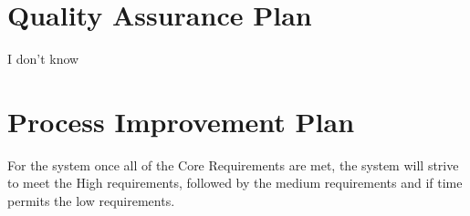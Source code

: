 
\section{Quality Assurance Plan}

I don't know



\section{Process Improvement Plan}

For the system once all of the Core Requirements are met, the system will strive to meet the High requirements, followed by the medium requirements and if time permits the low requirements.


